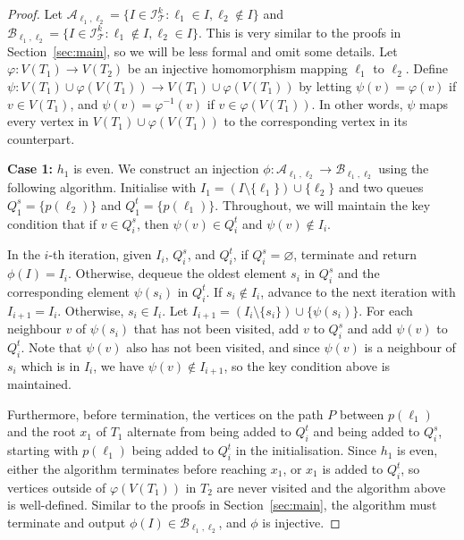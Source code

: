 \documentclass[11pt]{article}
\theoremstyle{definition}
\newcommand{\cI}{\mathcal{I}}
\begin{document}
\begin{proof}
Let $\mathcal{A}_{\ell_1,\ell_2}=\{I\in\cI^k_{\mathcal{T}}:\ell_1\in I, \ell_2\not\in I\}$ and $\mathcal{B}_{\ell_1,\ell_2}=\{I\in\cI^k_{\mathcal{T}}:\ell_1\not\in I, \ell_2\in I\}$. This is very similar to the proofs in Section~\ref{sec:main}, so we will be less formal and omit some details. %
Let $\varphi:V(T_1)\to V(T_2)$ be an injective homomorphism mapping $\ell_1$ to $\ell_2$. Define $\psi:V(T_1)\cup\varphi(V(T_1))\to V(T_1)\cup\varphi(V(T_1))$ by letting $\psi(v)=\varphi(v)$ if $v\in V(T_1)$, and $\psi(v)=\varphi^{-1}(v)$ if $v\in\varphi(V(T_1))$. In other words, $\psi$ maps every vertex in $V(T_1)\cup\varphi(V(T_1))$ to the corresponding vertex in its counterpart. 

\textbf{Case 1:} $h_1$ is even. We construct an injection $\phi:\mathcal{A}_{\ell_1,\ell_2}\to\mathcal{B}_{\ell_1,\ell_2}$ using the following algorithm. Initialise with $I_1 = (I \setminus \{\ell_1\}) \cup \{\ell_2\}$ and two queues $Q_1^s=\{p(\ell_2)\}$ and $Q_1^t=\{p(\ell_1)\}$. Throughout, we will maintain the key condition that if $v\in Q_i^s$, then $\psi(v)\in Q_i^t$ and $\psi(v)\not\in I_i$. 

In the $i$-th iteration, given $I_i$, $Q_i^s$, and $Q_i^t$, if $Q_i^s=\varnothing$, terminate and return $\phi(I)=I_i$. Otherwise, dequeue the oldest element $s_i$ in $Q_i^s$ and the corresponding element $\psi(s_i)$ in $Q_i^t$. If $s_i\not\in I_i$, advance to the next iteration with $I_{i+1}=I_i$. Otherwise, $s_i\in I_i$. Let $I_{i+1}=(I_i\setminus\{s_i\})\cup\{\psi(s_i)\}$. For each neighbour $v$ of $\psi(s_i)$ that has not been visited, add $v$ to $Q_i^s$ and add $\psi(v)$ to $Q_i^t$. Note that $\psi(v)$ also has not been visited, and since $\psi(v)$ is a neighbour of $s_i$ which is in $I_i$, we have $\psi(v)\not\in I_{i+1}$, so the key condition above is maintained. 

Furthermore, before termination, the vertices on the path $P$ between $p(\ell_1)$ and the root $x_1$ of $T_1$ alternate from being added to $Q_i^t$ and being added to $Q_i^s$, starting with $p(\ell_1)$ being added to $Q_i^t$ in the initialisation. Since $h_1$ is even, either the algorithm terminates before reaching $x_1$, or $x_1$ is added to $Q_i^t$, so vertices outside of $\varphi(V(T_1))$ in $T_2$ are never visited and the algorithm above is well-defined. Similar to the proofs in Section~\ref{sec:main}, the algorithm must terminate and output $\phi(I)\in\mathcal{B}_{\ell_1,\ell_2}$, and $\phi$ is injective. 


\end{proof}
\end{document}
